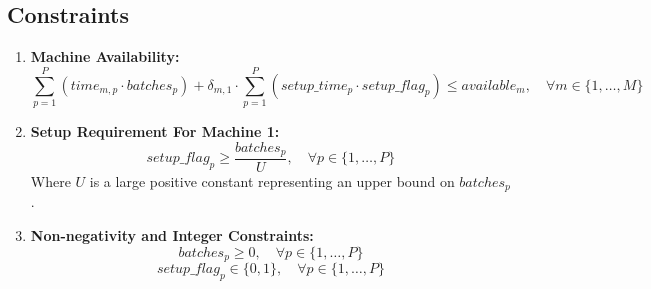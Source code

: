 \documentclass{article}
\begin{document}
\subsection*{Constraints}
\begin{enumerate}
    \item \textbf{Machine Availability:}
    \[
    \sum_{p=1}^{P} \left( time_{m,p} \cdot batches_{p} \right) + \delta_{m,1} \cdot \sum_{p=1}^{P} \left( setup\_time_{p} \cdot setup\_flag_{p} \right) \leq available_{m}, \quad \forall m \in \{1, \ldots, M\}
    \]

    \item \textbf{Setup Requirement For Machine 1:}
    \[
    setup\_flag_{p} \geq \frac{batches_{p}}{U}, \quad \forall p \in \{1, \ldots, P\}
    \]
    Where $U$ is a large positive constant representing an upper bound on $batches_{p}$.

    \item \textbf{Non-negativity and Integer Constraints:}
    \[
    batches_{p} \geq 0, \quad \forall p \in \{1, \ldots, P\}
    \]
    \[
    setup\_flag_{p} \in \{0, 1\}, \quad \forall p \in \{1, \ldots, P\}
    \]
\end{enumerate}
\end{document}

